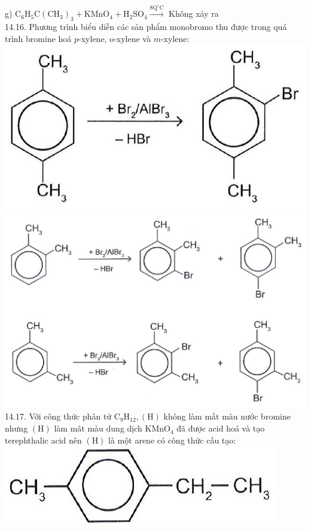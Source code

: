 \documentclass[10pt]{article}
\begin{document}
g) $\mathrm{C}_{6} \mathrm{H}_{5} \mathrm{C}\left(\mathrm{CH}_{3}\right)_{3}+\mathrm{KMnO}_{4}+\mathrm{H}_{2} \mathrm{SO}_{4} \xrightarrow{8 \mathrm{Q}^{\circ} \mathrm{C}}$ Không xảy ra\\
14.16. Phương trình biểu diễn các sản phẩm monobromo thu được trong quá trình bromine hoá $p$-xylene, o-xylene và $m$-xylene:\\
\includegraphics[max width=\textwidth, center]{2025_10_23_adad5b98d65ac6665838g-26(1)}\\
\includegraphics[max width=\textwidth, center]{2025_10_23_adad5b98d65ac6665838g-26(5)}\\
14.17. Với công thức phân tử $\mathrm{C}_{9} \mathrm{H}_{12},(\mathrm{H})$ không làm mất màu nước bromine nhưng $(\mathrm{H})$ làm mât màu dung dịch $\mathrm{KMnO}_{4}$ đã được acid hoá và tạo terephthalic acid nên $(\mathrm{H})$ là một arene có công thức cấu tạo:\\
\includegraphics[max width=\textwidth, center]{2025_10_23_adad5b98d65ac6665838g-26(3)}
\end{document}
